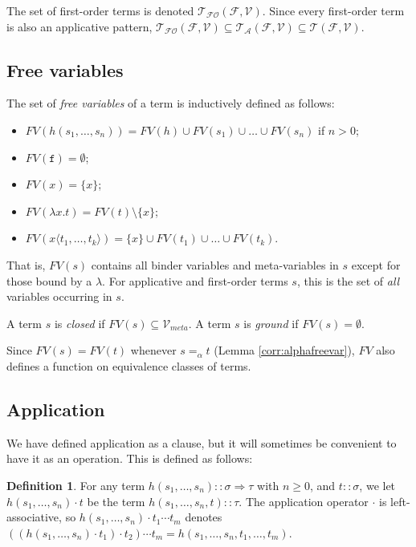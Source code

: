 \documentclass{lmcs}
\theoremstyle{theorem}\newtheorem{theorem}{Theorem}
\theoremstyle{theorem}\newtheorem{lemma}[theorem]{Lemma}
\theoremstyle{theorem}\newtheorem{corollary}[theorem]{Corollary}
\theoremstyle{definition}\newtheorem{definition}[theorem]{Definition}
\theoremstyle{definition}\newtheorem{example}[theorem]{Example}
\newcommand{\F}{\mathcal{F}}
\newcommand{\V}{\mathcal{V}}
\newcommand{\Vmeta}{\mathcal{V}_{\mathit{meta}}}
\newcommand{\Terms}{\mathcal{T}}
\newcommand{\ATerms}{\mathcal{T}_{\mathcal{A}}}
\newcommand{\FOTerms}{\mathcal{T}_{\mathcal{FO}}}
\newcommand{\FV}{\mathit{FV}}
\newcommand{\atype}{\sigma}
\newcommand{\btype}{\tau}
\newcommand{\identifier}[1]{\mathtt{#1}}
\newcommand{\afun}{\identifier{f}}
\newcommand{\avar}{x}
\newcommand{\abs}[2]{\lambda #1.#2}
\newcommand{\meta}[2]{#1\langle#2\rangle}
\newcommand{\arrtype}{\Rightarrow}
\begin{document}
The set of first-order terms is denoted $\FOTerms(\F,\V)$.  Since every first-order term is
also an applicative pattern, $\FOTerms(\F,\V) \subseteq \ATerms(\F,\V) \subseteq \Terms(\F,\V)$.

\subsection{Free variables}
The set of \emph{free variables} of a term is inductively defined as follows:
\begin{itemize}
\item $\FV(h(s_1,\dots,s_n)) = \FV(h) \cup \FV(s_1) \cup \dots \cup \FV(s_n)$ if $n > 0$;
\item $\FV(\afun) = \emptyset$;
\item $\FV(\avar) = \{ \avar \}$;
\item $\FV(\abs{\avar}{t}) = \FV(t) \setminus \{ \avar \}$;
\item $\FV(\meta{\avar}{t_1,\dots,t_k}) = \{ \avar \} \cup \FV(t_1) \cup \dots \cup \FV(t_k)$.
\end{itemize}
That is, $\FV(s)$ contains all binder variables and meta-variables in $s$ except for those bound
by a $\lambda$.
For applicative and first-order terms $s$, this is the set of \emph{all} variables occurring in
$s$.

A term $s$ is \emph{closed} if $\FV(s) \subseteq \Vmeta$.
A term $s$ is \emph{ground} if $\FV(s) = \emptyset$.

Since $\FV(s) = \FV(t)$ whenever $s =_\alpha t$ (Lemma \ref{corr:alphafreevar}),
$\FV$ also defines a function on equivalence classes of terms.

\subsection{Application}\label{subsec:application}
We have defined application as a clause, but it will sometimes be convenient to have it as an
operation.  This is defined as follows:

\begin{definition}
For any term $h(s_1,\dots,s_n) :: \atype \arrtype \btype$ with $n \geq 0$, and $t :: \atype$, we
let $h(s_1,\dots,s_n) \cdot t$ be the term $h(s_1,\dots,s_n,t) :: \btype$.
The application operator $\cdot$ is left-associative, so $h(s_1,\dots,s_n) \cdot t_1 \cdots t_m$
denotes $((h(s_1,\dots,s_n) \cdot t_1) \cdot t_2) \cdots t_m = h(s_1,\dots,s_n,t_1,\dots,t_m)$.
\end{definition}
\end{document}
